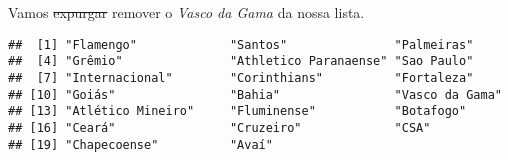 \documentclass[
]{book}
\newenvironment{Shaded}{\begin{snugshade}}{\end{snugshade}}
\newcommand{\CommentTok}[1]{\textcolor[rgb]{0.56,0.35,0.01}{\textit{#1}}}
\newcommand{\FloatTok}[1]{\textcolor[rgb]{0.00,0.00,0.81}{#1}}
\newcommand{\NormalTok}[1]{#1}
\newcommand{\SpecialCharTok}[1]{\textcolor[rgb]{0.00,0.00,0.00}{#1}}
\newcommand{\StringTok}[1]{\textcolor[rgb]{0.31,0.60,0.02}{#1}}
\begin{document}
Vamos \sout{expurgar} remover o \emph{Vasco da Gama} da nossa lista.

\begin{Shaded}
\end{Shaded}

\begin{verbatim}
##  [1] "Flamengo"             "Santos"               "Palmeiras"           
##  [4] "Grêmio"               "Athletico Paranaense" "Sao Paulo"           
##  [7] "Internacional"        "Corinthians"          "Fortaleza"           
## [10] "Goiás"                "Bahia"                "Vasco da Gama"       
## [13] "Atlético Mineiro"     "Fluminense"           "Botafogo"            
## [16] "Ceará"                "Cruzeiro"             "CSA"                 
## [19] "Chapecoense"          "Avaí"
\end{verbatim}

\begin{Shaded}
\end{Shaded}
\end{document}

